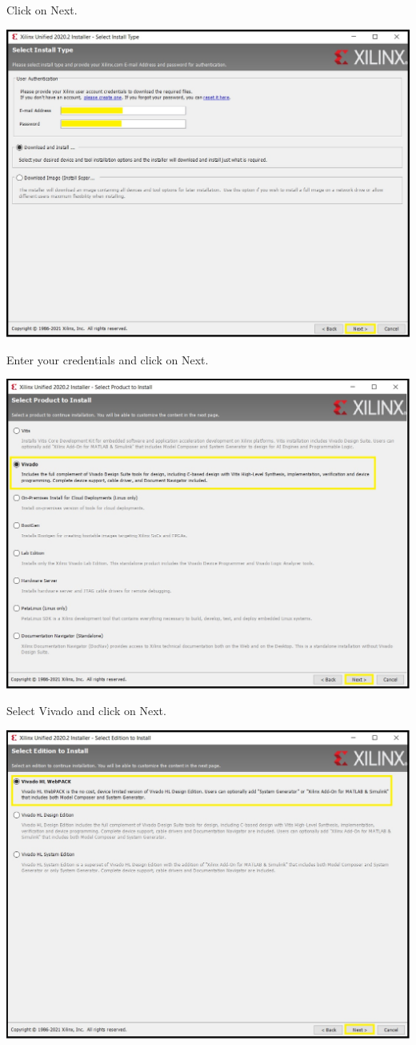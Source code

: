 Click on Next.

\includegraphics[width=\linewidth]{images/VivadoInstimg009.jpg}

Enter your credentials and click on Next.

\includegraphics[width=\linewidth]{images/VivadoInstimg010.jpg}

Select Vivado and click on Next.

\includegraphics[width=\linewidth]{images/VivadoInstimg011.jpg}

